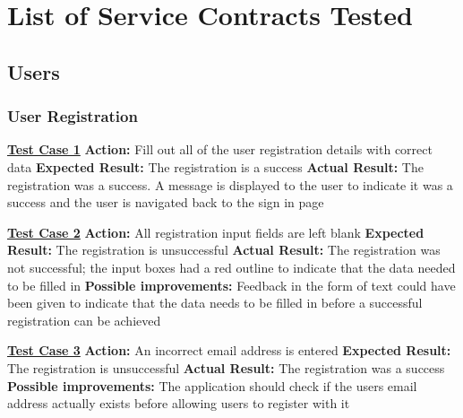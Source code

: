\documentclass[english]{article}
\begin{document}
		
	\section{List of Service Contracts Tested}
	
	\subsection{Users}
\subsubsection{User Registration}
\textbf{\underline{Test Case 1}}\newline
\textbf{Action:} Fill out all of the user registration details with correct data\newline
\textbf{Expected Result:} The registration is a success\newline
\textbf{Actual Result:} The registration was a success. A message is displayed to the user to indicate it was a success and the user is navigated back to the sign in page\newline

\textbf{\underline{Test Case 2}}\newline
\textbf{Action:} All registration input fields are left blank\newline
\textbf{Expected Result:} The registration is unsuccessful\newline
\textbf{Actual Result:} The registration was not successful; the input boxes had a red outline to indicate that the data needed to be filled in\newline
\textbf{Possible improvements:} Feedback in the form of text could have been given to indicate that the data needs to be filled in before a successful registration can be achieved\newline

\textbf{\underline{Test Case 3}}\newline
\textbf{Action:} An incorrect email address is entered\newline
\textbf{Expected Result:} The registration is unsuccessful\newline
\textbf{Actual Result:} The registration was a success\newline
\textbf{Possible improvements:} The application should check if the users email address actually exists before allowing users to register with it\newline
\end{document}
